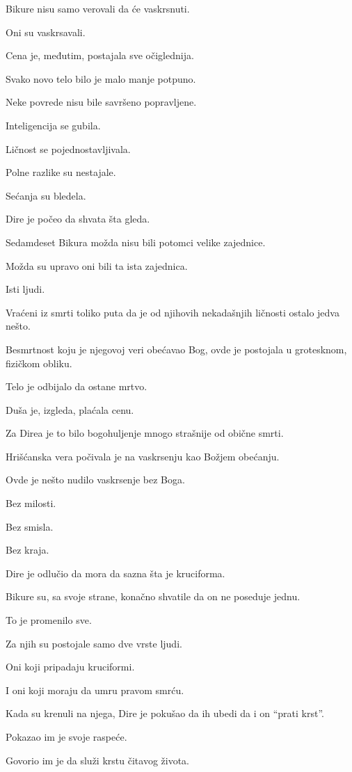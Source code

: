 Bikure nisu samo verovali da će vaskrsnuti.

Oni su vaskrsavali.

Cena je, međutim, postajala sve očiglednija.

Svako novo telo bilo je malo manje potpuno.

Neke povrede nisu bile savršeno popravljene.

Inteligencija se gubila.

Ličnost se pojednostavljivala.

Polne razlike su nestajale.

Sećanja su bledela.

Dire je počeo da shvata šta gleda.

Sedamdeset Bikura možda nisu bili potomci velike zajednice.

Možda su upravo oni bili ta ista zajednica.

Isti ljudi.

Vraćeni iz smrti toliko puta da je od njihovih nekadašnjih ličnosti ostalo jedva nešto.

Besmrtnost koju je njegovoj veri obećavao Bog, ovde je postojala u grotesknom, fizičkom obliku.

Telo je odbijalo da ostane mrtvo.

Duša je, izgleda, plaćala cenu.

Za Direa je to bilo bogohuljenje mnogo strašnije od obične smrti.

Hrišćanska vera počivala je na vaskrsenju kao Božjem obećanju.

Ovde je nešto nudilo vaskrsenje bez Boga.

Bez milosti.

Bez smisla.

Bez kraja.

Dire je odlučio da mora da sazna šta je kruciforma.

Bikure su, sa svoje strane, konačno shvatile da on ne poseduje jednu.

To je promenilo sve.

Za njih su postojale samo dve vrste ljudi.

Oni koji pripadaju kruciformi.

I oni koji moraju da umru pravom smrću.

Kada su krenuli na njega, Dire je pokušao da ih ubedi da i on ``prati krst''.

Pokazao im je svoje raspeće.

Govorio im je da služi krstu čitavog života.

